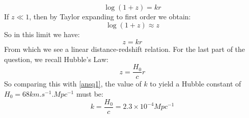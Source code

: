 \begin{equation}
    \log(1 + z) = kr
\end{equation}
If $z \ll 1$, then by Taylor expanding to first order we obtain:
\begin{equation}
    \log(1+z) \approx z
\end{equation}
So in this limit we have:
\begin{equation}\label{ansq1}
    \boxed{z = kr}
\end{equation}
From which we see a linear distance-redshift relation. For the last part of the question, we recall Hubble's Law:
\begin{equation}
    z = \frac{H_0}{c}r
\end{equation}
So comparing this with \eqref{ansq1}, the value of $k$ to yield a Hubble constant of $H_0 = 68 \si{km.s^{-1}.Mpc^{-1}}$ must be:
\begin{equation}
    \boxed{k = \frac{H_0}{c} = 2.3 \times 10^{-4}\si{Mpc^{-1}}}
\end{equation}

